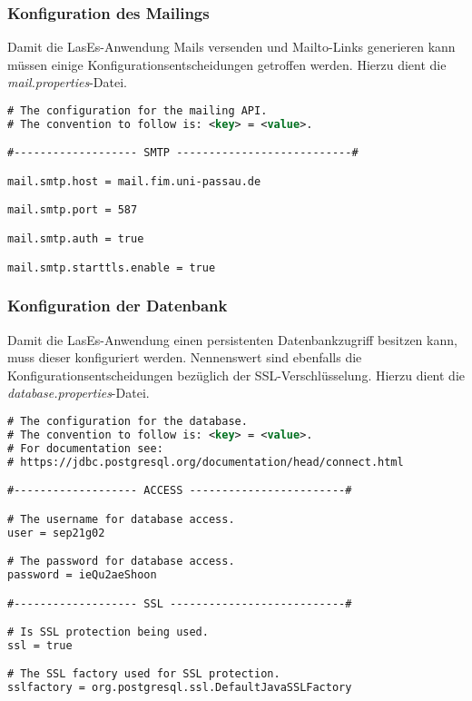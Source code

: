 \subsubsection{Konfiguration des Mailings}
Damit die LasEs-Anwendung Mails versenden und Mailto-Links generieren kann
müssen einige Konfigurationsentscheidungen getroffen werden.
Hierzu dient die \emph{mail.properties}-Datei.

\begin{lstlisting}[language=XML, caption = Die Mailingkonfiguration \emph{mail.properties}]
# The configuration for the mailing API.
# The convention to follow is: <key> = <value>.

#------------------- SMTP ---------------------------#

mail.smtp.host = mail.fim.uni-passau.de

mail.smtp.port = 587

mail.smtp.auth = true

mail.smtp.starttls.enable = true
\end{lstlisting}

\subsubsection{Konfiguration der Datenbank}
Damit die LasEs-Anwendung einen persistenten Datenbankzugriff besitzen kann,
muss dieser konfiguriert werden. Nennenswert sind ebenfalls die
Konfigurationsentscheidungen bezüglich der SSL-Verschlüsselung.
Hierzu dient die \emph{database.properties}-Datei.

\begin{lstlisting}[language=XML, caption = Die Datenbankkonfiguration \emph{database.properties}]
# The configuration for the database.
# The convention to follow is: <key> = <value>.
# For documentation see:
# https://jdbc.postgresql.org/documentation/head/connect.html

#------------------- ACCESS ------------------------#

# The username for database access.
user = sep21g02

# The password for database access.
password = ieQu2aeShoon

#------------------- SSL ---------------------------#

# Is SSL protection being used.
ssl = true

# The SSL factory used for SSL protection.
sslfactory = org.postgresql.ssl.DefaultJavaSSLFactory
\end{lstlisting}



